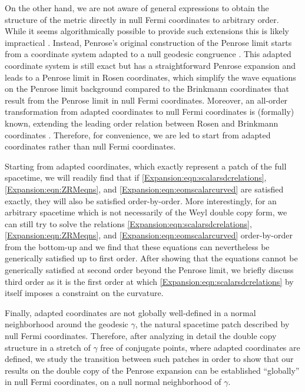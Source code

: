 On the other hand, we are not aware of general expressions to obtain the structure of the metric directly in null Fermi coordinates to arbitrary order. While it seems algorithmically possible to provide such extensions this is likely impractical \cite{li1979expansions}. Instead, Penrose's original construction of the Penrose limit starts from a coordinate system adapted to a null geodesic congruence \cite{penrose1976any}. This adapted coordinate system is still exact but has a straightforward Penrose expansion and leads to a Penrose limit in Rosen coordinates, which simplify the wave equations on the Penrose limit background compared to the Brinkmann coordinates that result from the Penrose limit in null Fermi coordinates. Moreover, an all-order transformation from adapted coordinates to null Fermi coordinates is (formally) known, extending the leading order relation between Rosen and Brinkmann coordinates \cite{Blau:2006ar}. Therefore, for convenience, we are led to start from adapted coordinates rather than null Fermi coordinates. 

Starting from adapted coordinates, which exactly represent a patch of the full spacetime, we will readily find that if \eqref{Expansion:eqn:scalarsdcrelations}, \eqref{Expansion:eqn:ZRMeqns}, and \eqref{Expansion:eqn:eomscalarcurved} are satisfied exactly, they will also be satisfied order-by-order. More interestingly, for an arbitrary spacetime which is not necessarily of the Weyl double copy form,  we can still try to solve  the relations \eqref{Expansion:eqn:scalarsdcrelations}, \eqref{Expansion:eqn:ZRMeqns}, and \eqref{Expansion:eqn:eomscalarcurved} order-by-order from the bottom-up and we find that these equations can nevertheless be generically satisfied up to first order. After showing that the equations cannot be generically satisfied at second order beyond the Penrose limit, we briefly discuss third order as it is the first order at which \eqref{Expansion:eqn:scalarsdcrelations} by itself imposes a constraint on the curvature. 

Finally, adapted coordinates are not globally well-defined in a normal neighborhood around the geodesic $\gamma$, the natural spacetime patch described by null Fermi coordinates. Therefore, after analyzing in detail the double copy structure in a stretch of $\gamma$ free of conjugate points, where adapted coordinates are defined, we study the transition between such patches in order to show that our results on the double copy of the Penrose expansion can be established ``globally'' in null Fermi coordinates, on a null normal neighborhood of $\gamma$. 


